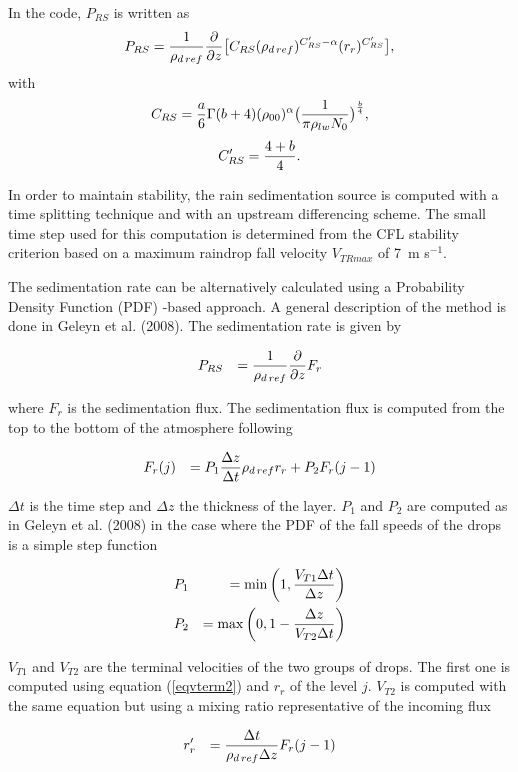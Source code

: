 In the code, $P_{RS}$ is written as
\begin{equation}
P_{RS} = {1 \over \rho_{d\,ref}}{\partial \over \partial z} \big[ C_{RS}
(\rho_{d\,ref})^{C'_{RS}-\alpha} (r_r )^{C'_{RS}}\big],
\end{equation}
with
$$C_{RS}= {a \over 6} \Gamma(b+4)( \rho_{00}) ^\alpha
\big( {1\over \pi \rho_{lw} N_0} \big)^{b \over 4},$$
$$C'_{RS}={4+b \over 4}.$$

In order to maintain stability, the rain sedimentation source is computed with
a time splitting technique and with  an upstream differencing scheme. The small
time step used for this computation is determined from the CFL stability
criterion based on a maximum raindrop fall velocity $V_{TRmax}$ of 7~m s$^{-1}$.

The sedimentation rate can be alternatively calculated using a Probability Density Function (PDF)
-based approach. A general
description of the method is done in Geleyn et al. (2008). The sedimentation rate is given by

\begin{eqnarray}
&P_{RS} &= {1 \over \rho_{d\,ref}} {\partial \over \partial z} F_r
\end{eqnarray}

where $F_r$ is the sedimentation flux. The sedimentation flux is computed from the top to the 
bottom of the atmosphere following

\begin{eqnarray}
&F_r(j) &= P_1 {\Delta z \over \Delta t} \rho_{d\,ref} r_r + P_2 F_r(j-1)
\end{eqnarray}

$\Delta t$ is the time step and $\Delta z$ the thickness of the layer. 
$P_1$ and $P_2$ are computed as in Geleyn et al. (2008) in the case where the PDF
of the fall speeds of the drops is a simple step function


\begin{eqnarray}
&P_1 &= \min\left(1,{V_{T1} \Delta t \over \Delta z} \right)  \\
&P_2 &= \max\left(0, 1 - {\Delta z \over V_{T2} \Delta t} \right)
\end{eqnarray}

$V_{T1}$ and $V_{T2}$ are the terminal velocities of the two groups of drops. The first one is computed
using equation (\ref{eqvterm2}) and $r_r$ of the level $j$. $V_{T2}$ is computed with the same equation but
using a mixing ratio representative of the incoming flux

\begin{eqnarray}
&r'_r &= {\Delta t \over \rho_{d\,ref} \Delta z} F_r(j-1) 
\end{eqnarray}

